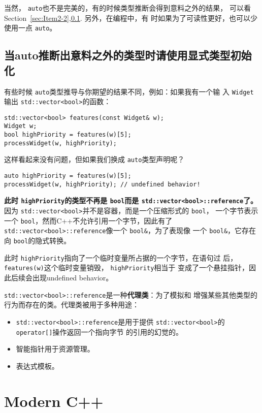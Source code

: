 \message{ !name(../CppLearning.tex)}\documentclass[a4paper,twoside]{article}
\theoremstyle{definition}
\theoremstyle{remark}
\numberwithin{equation}{section}
\let\OldTexttt\texttt
\renewcommand{\texttt}[1]{{\color{blue} \OldTexttt{#1}}}
\begin{document}
当然，\texttt{auto}也不是完美的，有的时候类型推断会得到意料之外的结果，
可以看Section~\ref{sec:Item2-2},\ref{sec:Item2-6}. 另外，在编程中，有
时如果为了可读性更好，也可以少使用一点\texttt{auto}。

\subsection{当auto推断出意料之外的类型时请使用显式类型初始化}
\label{sec:Item2-6}

有些时候\texttt{auto}类型推导与你期望的结果不同，例如：如果我有一个输
入\texttt{Widget}输出\texttt{std::vector<bool>}的函数：
\begin{verbatim}
std::vector<bool> features(const Widget& w);
Widget w;
bool highPriority = features(w)[5];
processWidget(w, highPriority);
\end{verbatim}
这样看起来没有问题，但如果我们换成\texttt{auto}类型声明呢？
\begin{verbatim}
auto highPriority = features(w)[5];
processWidget(w, highPriority); // undefined behavior!
\end{verbatim}

\textbf{此时\texttt{highPriority}的类型不再是\texttt{bool}而是
\texttt{std::vector<bool>::reference}了。}因为
\texttt{std::vector<bool>}并不是容器，而是一个压缩形式的\texttt{bool}，
一个字节表示一个\texttt{bool}，然而C++不允许引用一个字节，因此有了
\texttt{std::vector<bool>::reference}像一个\texttt{bool\&}，为了表现像
一个\texttt{bool\&}，它存在向\texttt{bool}的隐式转换。

此时\texttt{highPriority}指向了一个临时变量所占据的一个字节，在语句过
后，\texttt{features(w)}这个临时变量销毁，\texttt{highPriority}相当于
变成了一个悬挂指针，因此后续会出现undefined behavior。

\texttt{std::vector<bool>::reference}是一种\textbf{代理类}：为了模拟和
增强某些其他类型的行为而存在的类。代理类被用于多种用途：
\begin{itemize}
\item \texttt{std::vector<bool>::reference}是用于提供
  \texttt{std::vector<bool>}的\texttt{operator[]}操作返回一个指向字节
  的引用的幻觉的。
\item 智能指针用于资源管理。
\item 表达式模板。
\end{itemize}

\section{Modern C++}
\end{document}

